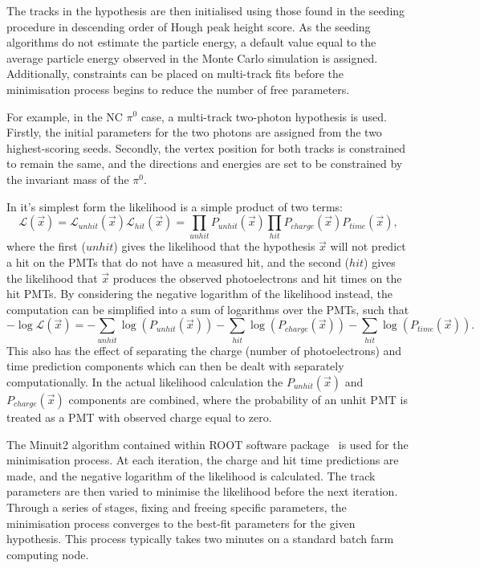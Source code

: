 The tracks in the hypothesis are then initialised using those found in the seeding procedure in
descending order of Hough peak height score. As the seeding algorithms do not estimate the
particle energy, a default value equal to the average particle energy observed in the Monte Carlo
simulation is assigned. Additionally, constraints can be placed on multi-track fits before the
minimisation process begins to reduce the number of free parameters.

For example, in the NC $\pi^{0}$ case, a multi-track two-photon hypothesis is used. Firstly, the
initial parameters for the two photons are assigned from the two highest-scoring seeds. Secondly,
the vertex position for both tracks is constrained to remain the same, and the directions and
energies are set to be constrained by the invariant mass of the $\pi^{0}$.

In it's simplest form the likelihood is a simple product of two terms:
\begin{equation} %
    \mathcal{L}(\vec{x})=\mathcal{L}_{unhit}(\vec{x})\mathcal{L}_{hit}(\vec{x})=
    \prod_{unhit}P_{unhit}(\vec{x})\prod_{hit}P_{charge}(\vec{x})P_{time}(\vec{x}),
    \label{eq:likelihood}
\end{equation}
where the first ($unhit$) gives the likelihood that the hypothesis $\vec{x}$ will not predict a
hit on the PMTs that do not have a measured hit, and the second ($hit$) gives the likelihood that
$\vec{x}$ produces the observed photoelectrons and hit times on the hit PMTs. By considering the
negative logarithm of the likelihood instead, the computation can be simplified into a sum of
logarithms over the PMTs, such that
\begin{equation} %
    -\log\mathcal{L}(\vec{x})=
    -\sum_{unhit}\log(P_{unhit}(\vec{x}))
    -\sum_{hit}\log(P_{charge}(\vec{x}))
    -\sum_{hit}\log(P_{time}(\vec{x})).
    \label{eq:likelihood_sum}
\end{equation}
This also has the effect of separating the charge (number of photoelectrons) and time prediction
components which can then be dealt with separately computationally. In the actual likelihood
calculation the $P_{unhit}(\vec{x})$ and $P_{charge}(\vec{x})$ components are combined, where the
probability of an unhit PMT is treated as a PMT with observed charge equal to zero.

The Minuit2 algorithm contained within ROOT software package~\cite{brun1997} is used for the
minimisation process. At each iteration, the charge and hit time predictions are made, and the
negative logarithm of the likelihood is calculated. The track parameters are then varied to
minimise the likelihood before the next iteration. Through a series of stages, fixing and freeing
specific parameters, the minimisation process converges to the best-fit parameters for the given
hypothesis. This process typically takes two minutes on a standard batch farm computing node.

